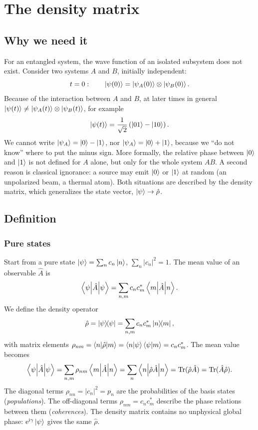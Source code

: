 \chapter{The density matrix}\label{ch:density}

\section{Why we need it}
For an entangled system, the wave function of an isolated subsystem does not exist. Consider two systems $A$ and $B$, initially independent:
\begin{equation}
  t=0:\qquad\left|\psi(0)\right\rangle=\left|\psi_A(0)\right\rangle\otimes\left|\psi_B(0)\right\rangle.
\end{equation}
Because of the interaction between $A$ and $B$, at later times in general $\left|\psi(t)\right\rangle\neq\left|\psi_A(t)\right\rangle\otimes\left|\psi_B(t)\right\rangle$, for example
\begin{equation}
  \left|\psi(t)\right\rangle=\frac1{\sqrt2}\left(\left|01\right\rangle-\left|10\right\rangle\right).
\end{equation}
We cannot write $\left|\psi_A\right\rangle=\left|0\right\rangle-\left|1\right\rangle$, nor $\left|\psi_A\right\rangle=\left|0\right\rangle+\left|1\right\rangle$, because we ``do not know'' where to put the minus sign. More formally, the relative phase between
$\left|0\right\rangle$ and $\left|1\right\rangle$ is not defined for $A$ alone, but only for the whole system $AB$. A second reason is classical ignorance: a source may emit $\left|0\right\rangle$ or $\left|1\right\rangle$ at
random (an unpolarized beam, a thermal atom). Both situations are described by the density matrix, which generalizes the state vector, $\left|\psi\right\rangle\to\hat\rho$.

\section{Definition}
\subsection{Pure states}
Start from a pure state $\left|\psi\right\rangle=\sum_nc_n\left|n\right\rangle$, $\sum_n|c_n|^2=1$. The mean value of an observable $\hat A$ is
\begin{equation}
  \left\langle\psi\middle|\hat A\middle|\psi\right\rangle=\sum_{n,m}c_nc_m^*\left\langle m\middle|\hat A\middle|n\right\rangle.
\end{equation}
We define the density operator
\begin{equation}
  \hat\rho=\left|\psi\middle\rangle\!\middle\langle\psi\right|=\sum_{n,m}c_nc_m^*\left|n\middle\rangle\!\middle\langle m\right|,
\end{equation}
with matrix elements $\rho_{nm}=\left\langle n\middle|\hat\rho\middle|m\right\rangle=\left\langle n\middle|\psi\right\rangle\left\langle\psi\middle|m\right\rangle=c_nc_m^*$. The mean value becomes
\begin{equation}\label{eq:meantrace}
  \left\langle\psi\middle|\hat A\middle|\psi\right\rangle=\sum_{n,m}\rho_{nm}\left\langle m\middle|\hat A\middle|n\right\rangle=\sum_n\left\langle n\middle|\hat\rho\hat A\middle|n\right\rangle=\operatorname{Tr}(\hat\rho\hat A)=\operatorname{Tr}(\hat A\hat\rho).
\end{equation}
The diagonal terms $\rho_{nn}=|c_n|^2=p_n$ are the probabilities of the basis states (\emph{populations}). The off-diagonal terms $\rho_{nm}=c_nc_m^*$ describe the
phase relations between them (\emph{coherences}). The density matrix contains no unphysical global phase: $\mathrm e^{\mathrm i\gamma}\left|\psi\right\rangle$ gives the same $\hat\rho$.

